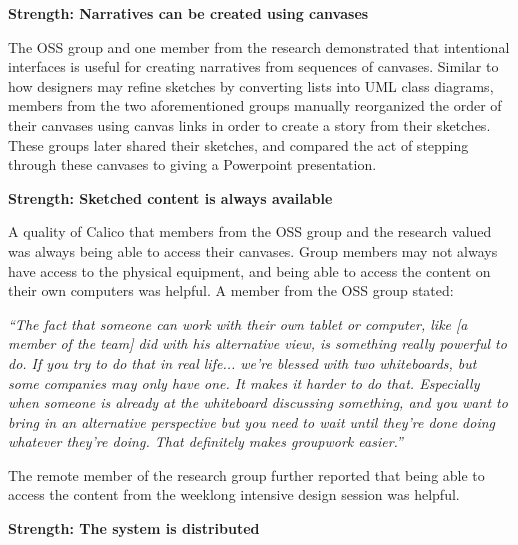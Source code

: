 %

\textbf{Strength: Narratives can be created using canvases}

The OSS group and one member from the research demonstrated that intentional interfaces is useful for creating narratives from sequences of canvases. Similar to how designers may refine sketches by converting lists into UML class diagrams, members from the two aforementioned groups manually reorganized the order of their canvases using canvas links in order to create a story from their sketches. These groups later shared their sketches, and compared the act of stepping through these canvases to giving a Powerpoint presentation.

\textbf{Strength: Sketched content is always available}

A quality of Calico that members from the OSS group and the research valued was always being able to access their canvases. Group members may not always have access to the physical equipment, and being able to access the content on their own computers was helpful. A member from the OSS group stated:

\begin{myindentpar}{1cm}
\emph{``The fact that someone can work with their own tablet or computer, like [a member of the team] did with his alternative view, is something really powerful to do. If you try to do that in real life... we're blessed with two whiteboards, but some companies may only have one. It makes it harder to do that. Especially when someone is already at the whiteboard discussing something, and you want to bring in an alternative perspective but you need to wait until they're done doing whatever they're doing. That definitely makes groupwork easier.''}
\end{myindentpar}

The remote member of the research group further reported that being able to access the content from the weeklong intensive design session was helpful. 


\textbf{Strength: The system is distributed}

